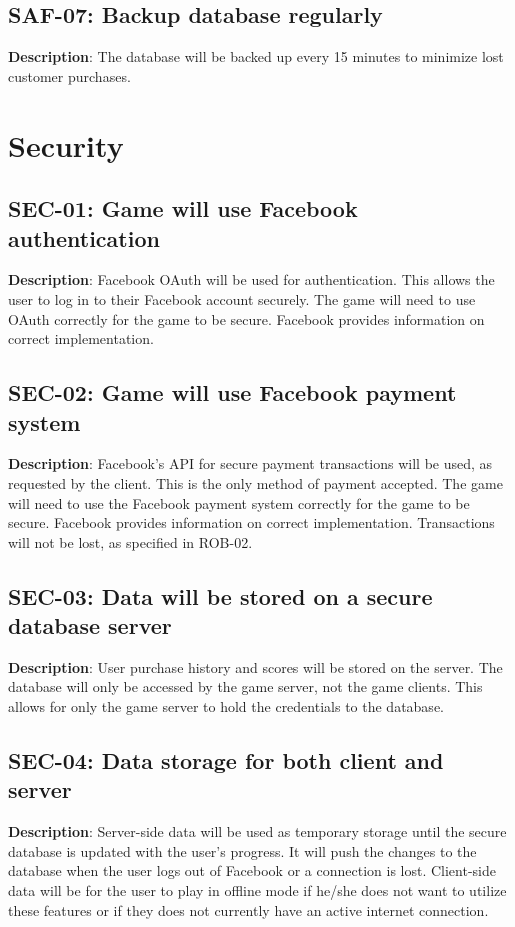 \subsection{SAF-07: Backup database regularly}
\textbf{Description}: The database will be backed up every 15 minutes to minimize
lost customer purchases.
\section{Security}
\subsection{SEC-01: Game will use Facebook authentication}
\textbf{Description}: Facebook OAuth will be used for authentication. This
allows the user to log in to their Facebook account securely. The
game will need to use OAuth correctly for the game to be secure. Facebook
provides information on correct implementation.
\subsection{SEC-02: Game will use Facebook payment system}
\textbf{Description}: Facebook\textquoteright{}s API for secure payment transactions
will be used, as requested by the client. This is the only method
of payment accepted. The game will need to use the Facebook payment
system correctly for the game to be secure. Facebook provides information
on correct implementation. Transactions will not be lost, as specified
in ROB-02.
\subsection{SEC-03: Data will be stored on a secure database server}
\textbf{Description}: User purchase history and scores will be stored on the
server. The database will only be accessed by the game server, not
the game clients. This allows for only the game server to hold the
credentials to the database. 
\subsection{SEC-04: Data storage for both client and server}
\textbf{Description}: Server-side data will be used as temporary storage until
the secure database is updated with the user\textquoteright{}s progress.
It will push the changes to the database when the user logs out of
Facebook or a connection is lost. Client-side data will be for the
user to play in offline mode if he/she does not want to utilize these
features or if they does not currently have an active internet connection.
